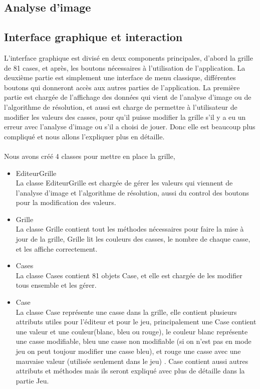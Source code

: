 \documentclass{article}
\begin{document}
\subsection{Analyse d'image}
\subsection{Interface graphique et interaction}
L’interface graphique est divisé en deux components principales, d’abord la grille de 81 cases, et après, les boutons nécessaires à l'utilisation de l’application. La deuxième partie est simplement une interface de menu classique, différentes boutons qui donneront accès aux autres parties de l’application. La première partie est chargée de l’affichage des données qui vient de l’analyse d’image ou de l'algorithme de résolution, et aussi est charge de permettre à l'utilisateur de modifier les valeurs des casses, pour qu'il puisse modifier la grille s’il y a eu un erreur avec l’analyse d’image ou s’il a choisi de jouer. Donc elle est beaucoup plus compliqué et nous allons l’expliquer plus en détaille.
\\
\\
Nous avons créé 4 classes pour  mettre en place la grille, 

\begin{itemize}
    \item EditeurGrille \\
La classe EditeurGrille est chargée de gérer les valeurs qui viennent de l’analyse d’image et l’algorithme de résolution, aussi du control des boutons pour la modification des valeurs. 

    \item Grille \\
La classe Grille contient tout les méthodes nécessaires pour faire la mise à jour de la grille, Grille lit les couleurs des casses, le nombre de chaque casse, et les affiche correctement.
    
    \item Cases \\
La classe Cases contient 81 objets Case, et elle est chargée de les modifier tous ensemble et les gérer. 
    
    \item Case \\
La classe Case représente une casse dans la grille, elle contient plusieurs attributs utiles pour l'éditeur et pour le jeu, principalement une Case contient une valeur et une couleur(blanc, bleu ou rouge), le couleur blanc représente une casse modifiable, bleu une casse non modifiable (si on n’est pas en mode jeu on peut toujour modifier une casse bleu), et rouge une casse avec une mauvaise valeur (utilisée seulement dans le jeu) . Case contient aussi autres attributs et méthodes mais ils seront expliqué avec plus de détaille dans la partie Jeu.

\end{itemize}\\
\end{document}
